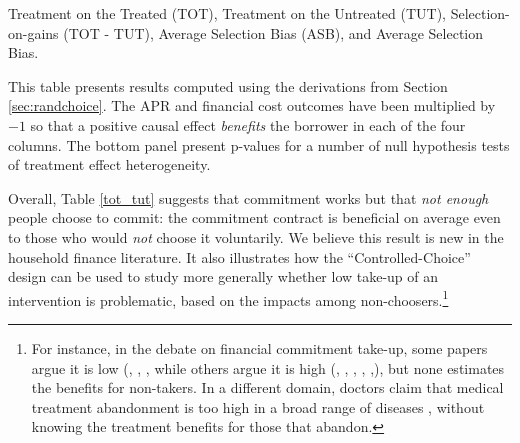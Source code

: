\documentclass[12pt, a4paper]{article}
\begin{document}
\begin{table}[H]
\caption{Treatment on the Treated (TOT), Treatment on the Untreated (TUT), Selection-on-gains (TOT - TUT), Average Selection Bias (ASB), and Average Selection Bias.}
\label{tot_tut}
\begin{center}
\footnotesize{}
\end{center}
\footnotesize{This table presents results computed using the derivations from Section \ref{sec:randchoice}. The APR and financial cost outcomes have been multiplied by $-1$ so that a positive causal effect \emph{benefits} the borrower in each of the four columns. The bottom panel present p-values for a number of null hypothesis tests of treatment effect heterogeneity. }
\end{table}

Overall, Table \ref{tot_tut} suggests that commitment works but that \emph{not enough} people choose to commit: the commitment contract is beneficial on average even to those who would \emph{not} choose it voluntarily. We believe this result is new in the household finance literature. It also illustrates how the ``Controlled-Choice'' design can be used to study more generally whether low take-up of an intervention is problematic, based on the impacts among non-choosers.\footnote{For instance, in the debate on financial commitment take-up, some papers argue it is low (\cite{Ashraf}, \cite{Gine}, \cite{Ted}, \cite{Royer} while others argue it is high (\cite{Kremer}, \cite{Casaburi}, \cite{Alcohol}, \cite{AprajitP&P}, \cite{Pascaline},), but none estimates the benefits for non-takers. In a different domain, doctors claim that medical treatment abandonment is too high in a broad range of diseases \citep{non_adherence}, without knowing the treatment benefits for those that abandon.}



\end{document}
